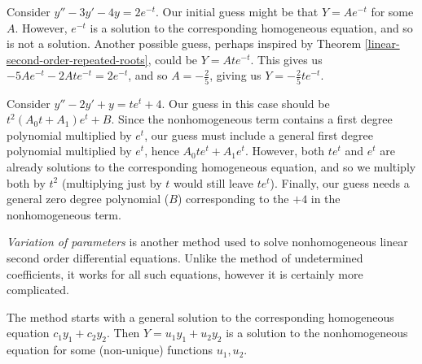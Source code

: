 \begin{exmp}
    Consider $y'' - 3y' - 4y = 2e^{-t}$. Our initial guess might be that $Y = Ae^{-t}$ for some $A$. However, $e^{-t}$ is a solution to the corresponding homogeneous equation, and so is not a solution. Another possible guess, perhaps inspired by Theorem \ref{linear-second-order-repeated-roots}, could be $Y = Ate^{-t}$. This gives us $-5Ae^{-t} - 2Ate^{-t} = 2e^{-t}$, and so $A = -\frac{2}{5}$, giving us $Y = -\frac{2}{5}te^{-t}$.
\end{exmp}

\begin{exmp}
    Consider $y'' - 2y' + y = te^t + 4$. Our guess in this case should be $t^2(A_0t + A_1)e^t + B$. Since the nonhomogeneous term contains a first degree polynomial multiplied by $e^t$, our guess must include a general first degree polynomial multiplied by $e^t$, hence $A_0te^t + A_1e^t$. However, both $te^t$ and $e^t$ are already solutions to the corresponding homogeneous equation, and so we multiply both by $t^2$ (multiplying just by $t$ would still leave $te^t$). Finally, our guess needs a general zero degree polynomial ($B$) corresponding to the $+4$ in the nonhomogeneous term.
\end{exmp}

\begin{defn}
    \emph{Variation of parameters} is another method used to solve nonhomogeneous linear second order differential equations. Unlike the method of undetermined coefficients, it works for all such equations, however it is certainly more complicated.

    The method starts with a general solution to the corresponding homogeneous equation $c_1y_1 + c_2y_2$. Then $Y = u_1y_1 + u_2y_2$ is a solution to the nonhomogeneous equation for some (non-unique) functions $u_1, u_2$.
\end{defn}

